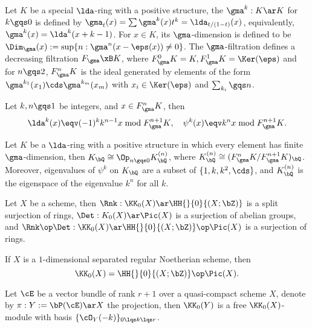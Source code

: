 \documentclass[article, a4paper, twoside]{universal}
\begin{document}
\begin{dfn}
    Let $K$ be a special $\lda$-ring with a positive structure, the  $\gma^{k}:K\ar K$ for $k\gqs0$ is defined by $\gma_{t}(x)=\sum\gma^{k}(x)t^{k}=\lda_{t/(1-t)}(x)$, equivalently, $\gma^{k}(x)=\lda^{k}(x+k-1)$. For $x\in K$, its $\gma$-dimension is defined to be $\Dim_{\gma}(x):=\sup\{n:\gma^{n}(x-\eps(x))\neq0\}$. The $\gma$-filtration defines a decreasing filtration $F_{\gma}\xB K$, where $F_{\gma}^{0}K=K, F_{\gma}^{1}K=\Ker(\eps)$ and for $n\gqs2$, $F_{\gma}^{n}K$ is the ideal generated by elements of the form $\gma^{k_{1}}(x_{1})\cds\gma^{k_{m}}(x_{m})$ with $x_{i}\in\Ker(\eps)$ and $\sum_{k_{i}}\gqs n$.
\end{dfn}

\begin{thm}[\Rnum{2}.4.9]
    Let $k,n\gqs1$ be integers, and $x\in F_{\gma}^{n}K$, then
    \[
        \lda^{k}(x)\eqv(-1)^{k}k^{n-1}x\bmod{F_{\gma}^{n+1}K},\quad \psi^{k}(x)\eqv k^{n}x\bmod{F_{\gma}^{n+1}K}.
    \]
\end{thm}


\begin{thm}[\Rnum{2}.4.10]
    Let $K$ be a $\lda$-ring with a positive structure in which every element has finite $\gma$-dimension, then $K_{\bQ}\cong\Op_{n\gqs0}K_{\bQ}^{(n)}$, where $K_{\bQ}^{(n)}\cong(F_{\gma}^{n}K/F_{\gma}^{n+1}K)_{\bQ}$. Moreover, eigenvalues of $\psi^{k}$ on $K_{\bQ}$ are a subset of $\{1,k,k^{2},\cds\}$, and $K_{\bQ}^{(n)}$ is the eigenspace of the eigenvalue $k^{n}$ for all $k$.
\end{thm}

\begin{thm}[\Rnum{2}.8.1]
    Let $X$ be a scheme, then $\Rnk:\KK_{0}(X)\ar\HH{}{0}{(X;\bZ)}$ is a split surjection of rings, $\Det:K_{0}(X)\ar\Pic(X)$ is a surjection of abelian groups, and $\Rnk\op\Det:\KK_{0}(X)\ar\HH{}{0}{(X;\bZ)}\op\Pic(X)$ is a surjection of rings.
\end{thm}

\begin{thm}[\Rnum{2}.8.2.1]
    If $X$ is a $1$-dimensional separated regular Noetherian scheme, then
    \[
        \KK_{0}(X)=\HH{}{0}{(X;\bZ)}\op\Pic(X).
    \]
\end{thm}

\begin{thm}[\Rnum{2}.8.5]
    Let $\cE$ be a vector bundle of rank $r+1$ over a quasi-compact scheme $X$, denote by $\pi:Y:=\bP(\cE)\ar X$ the projection, then $\KK_{0}(Y)$ is a free $\KK_{0}(X)$-module with basis $\{\cO_{Y}(-k)\}_{0\lqs k\lqs r}$.
\end{thm}
\end{document}
